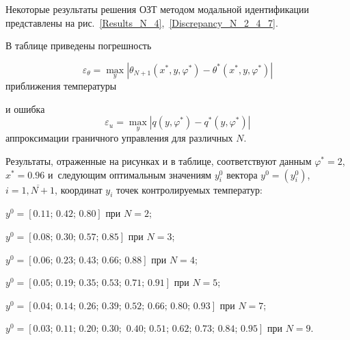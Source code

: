 Некоторые результаты решения ОЗТ методом модальной идентификации представлены на рис.~\ref{Results_N_4},~\ref{Discrepancy_N_2_4_7}.

В таблице  приведены погрешность  

$$\varepsilon _\theta  =  \max \limits_y | \theta _{N + 1}(x^*,y,\varphi ^*) - \theta ^*(x^*,y,\varphi ^*) |$$ приближения температуры 

и ошибка $${\varepsilon _u} = \max \limits_y | q ( y,\varphi ^* ) - q^*(y,\varphi ^*) |$$  аппроксимации граничного управления для различных $N$. 

Результаты, отраженные на рисунках и в таблице, соответствуют данным $\varphi ^* = 2$, $x^* = 0.96$ и~следующим оптимальным значениям $y_i^0$ вектора $y^0=(y_i^0)$, $i = \overline {1,N + 1}$,  координат $y_i$ точек контролируемых температур: \pagebreak





$y^0 = [0.11;\,0.42;\,0.80]$ при $N = 2$; 



$y^0 = [0.08;\,0.30;\,0.57;\,0.85]$ при $N = 3$;



$y^0 = [0.06;\,0.23;\,0.43;\,0.66;\,0.88]$ при $N = 4$; 



$y^0 = [0.05;\,0.19;\,0.35;\,0.53;\,0.71;\,0.91]$ при $N = 5$; 



$y^0 = [0.04;\,0.14;\,0.26;\,0.39;\,0.52;\,0.66;\,0.80;\,0.93]$ при $N = 7$;



$y^0 = [0.03;\,0.11;\,0.20;\,0.30;\,\,0.40;\,0.51;\,0.62;\,0.73;\,0.84;\,0.95]$ при $N = 9$.








